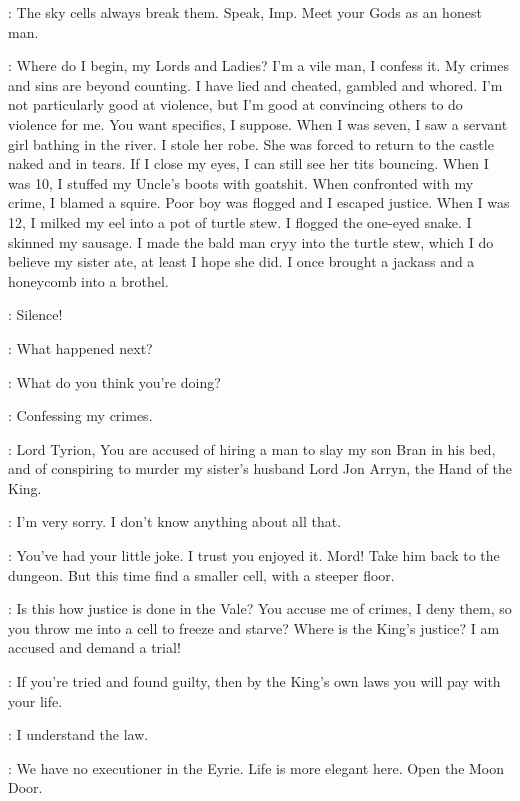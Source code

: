 \LYSA: The sky cells always break them. Speak, Imp. Meet your Gods as an honest man. 

\TYRION: Where do I begin, my Lords and Ladies? I'm a vile man, I confess it. My crimes and sins are beyond counting. I have lied and cheated, gambled and whored. I'm not particularly good at violence, but I'm good at convincing others to do violence for me. You want specifics, I suppose. When I was seven, I saw a servant girl bathing in the river. I stole her robe. She was forced to return to the castle naked and in tears. If I close my eyes, I can still see her tits bouncing. When I was 10, I stuffed my Uncle's boots with goatshit. When confronted with my crime, I blamed a squire. Poor boy was flogged and I escaped justice. When I was 12, I milked my eel into a pot of turtle stew. I flogged the one-eyed snake. I skinned my sausage. I made the bald man cryy into the turtle stew, which I do believe my sister ate, at least I hope she did. I once brought a jackass and a honeycomb into a brothel.

\LYSA: Silence! 

\ROBYN: What happened next? 

\LYSA: What do you think you're doing? 

\TYRION: Confessing my crimes. 

\CATELYN: Lord Tyrion, You are accused of hiring a man to slay my son Bran in his bed, and of conspiring to murder my sister's husband Lord Jon Arryn, the Hand of the King. 

\TYRION: I'm very sorry. I don't know anything about all that. 

\LYSA: You've had your little joke. I trust you enjoyed it. Mord! Take him back to the dungeon. But this time find a smaller cell, with a steeper floor. 

\TYRION: Is this how justice is done in the Vale? You accuse me of crimes, I deny them, so you throw me into a cell to freeze and starve? Where is the King's justice? I am accused and demand a trial! 

\LYSA: If you're tried and found guilty, then by the King's own laws you will pay with your life. 

\TYRION: I understand the law. 

\LYSA: We have no executioner in the Eyrie. Life is more elegant here. Open the Moon Door. 



